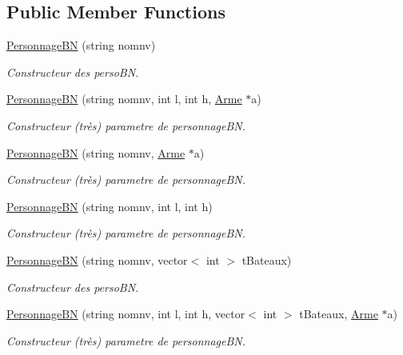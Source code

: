 \subsection*{Public Member Functions}
\begin{DoxyCompactItemize}
\item 
\hyperlink{classPersonnageBN_a09564d1f60e3e8ac05e7197cf886d45c}{Personnage\-B\-N} (string nomnv)
\begin{DoxyCompactList}\small\item\em Constructeur des perso\-B\-N. \end{DoxyCompactList}\item 
\hyperlink{classPersonnageBN_a6391c5c85d03608e309883c965638de5}{Personnage\-B\-N} (string nomnv, int l, int h, \hyperlink{classArme}{Arme} $\ast$a)
\begin{DoxyCompactList}\small\item\em Constructeur (très) parametre de personnage\-B\-N. \end{DoxyCompactList}\item 
\hyperlink{classPersonnageBN_af5a557a3a1114ef67ac5ac37ffec6d8a}{Personnage\-B\-N} (string nomnv, \hyperlink{classArme}{Arme} $\ast$a)
\begin{DoxyCompactList}\small\item\em Constructeur (très) parametre de personnage\-B\-N. \end{DoxyCompactList}\item 
\hyperlink{classPersonnageBN_aa5b7ac10ef5611e0e869a681c2cda915}{Personnage\-B\-N} (string nomnv, int l, int h)
\begin{DoxyCompactList}\small\item\em Constructeur (très) parametre de personnage\-B\-N. \end{DoxyCompactList}\item 
\hyperlink{classPersonnageBN_ae701e953e890a4168268f003b44c886f}{Personnage\-B\-N} (string nomnv, vector$<$ int $>$ t\-Bateaux)
\begin{DoxyCompactList}\small\item\em Constructeur des perso\-B\-N. \end{DoxyCompactList}\item 
\hyperlink{classPersonnageBN_a24f6e9b0b2ce83fdd3d49e77fac63ce3}{Personnage\-B\-N} (string nomnv, int l, int h, vector$<$ int $>$ t\-Bateaux, \hyperlink{classArme}{Arme} $\ast$a)
\begin{DoxyCompactList}\small\item\em Constructeur (très) parametre de personnage\-B\-N. \end{DoxyCompactList}\item 

\end{DoxyCompactItemize}
